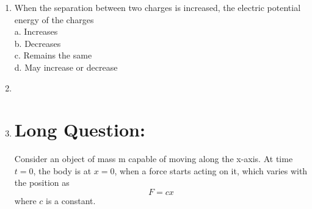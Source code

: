 \documentclass{article}
\begin{document}
\begin{enumerate}
    \item When the separation between two charges is increased, the electric potential energy of the charges \\
    a. Increases\\
    b. Decreases\\
    c. Remains the same\\
    d. May increase or decrease
    
    \item 
    
    \item
    
\section*{\textbf{Long Question:}}
Consider an object of mass m capable of moving along the x-axis. At time $t=0$, the body is at $x=0$, when a force starts acting on it, which varies with the position as
	$$F=cx$$
where $c$ is a constant.




    
    

\end{enumerate}
\end{document}
